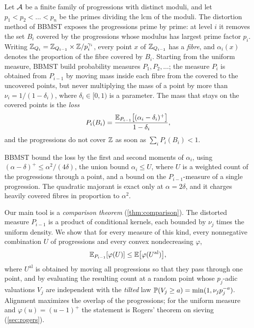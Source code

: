 Let $\cA$ be a finite family of progressions with distinct moduli, and let $p_1<p_2<\dots<p_n$ be the primes
dividing the lcm of the moduli. The distortion method of BBMST exposes the progressions prime by prime: at level
$i$ it removes the set $B_i$ covered by the progressions whose modulus has largest prime factor $p_i$. Writing
$\Z_{Q_i}=\Z_{Q_{i-1}}\times\Z/p_i^{\gamma_i}$, every point $x$ of $\Z_{Q_{i-1}}$ has a \emph{fibre}, and
$\alpha_i(x)$ denotes the proportion of the fibre covered by $B_i$. Starting from the uniform measure, BBMST build
probability measures $P_1,P_2,\dots$; the measure $P_i$ is obtained from $P_{i-1}$ by moving mass inside each fibre
from the covered to the uncovered points, but never multiplying the mass of a point by more than
$\nu_i=1/(1-\delta_i)$, where $\delta_i\in[0,1)$ is a parameter. The mass that stays on the covered points is the
\emph{loss}
\begin{equation}\label{eq:intro-loss}
  P_i(B_i)=\frac{\E_{P_{i-1}}\bigl[(\alpha_i-\delta_i)^+\bigr]}{1-\delta_i},
\end{equation}
and the progressions do not cover $\Z$ as soon as $\sum_i P_i(B_i)<1$.

BBMST bound the loss by the first and second moments of $\alpha_i$, using $(\alpha-\delta)^+\le\alpha^2/(4\delta)$,
the union bound $\alpha_i\le U$, where $U$ is a weighted count of the progressions through a point, and a bound
on the $P_{i-1}$-measure of a single progression. The quadratic majorant is exact only at $\alpha=2\delta$, and it
charges heavily covered fibres in proportion to $\alpha^2$.

Our main tool is a \emph{comparison theorem} (\cref{thm:comparison}). The distorted measure $P_{i-1}$ is a product
of conditional kernels, each bounded by $\nu_j$ times the uniform density. We show that for every measure of this
kind, every nonnegative combination $U$ of progressions and every convex nondecreasing $\varphi$,
\[
  \E_{P_{i-1}}[\varphi(U)]\le\E\bigl[\varphi(U^{\mathrm{al}})\bigr],
\]
where $U^{\mathrm{al}}$ is obtained by moving all progressions so that they pass through one point, and by
evaluating the resulting count at a random point whose $p_j$-adic valuations $V_j$ are independent with the
\emph{tilted} law $\P(V_j\ge a)=\min(1,\nu_j p_j^{-a})$. Alignment maximizes the overlap of the progressions; for
the uniform measure and $\varphi(u)=(u-1)^+$ the statement is Rogers' theorem on sieving
(\cref{sec:rogers}).

